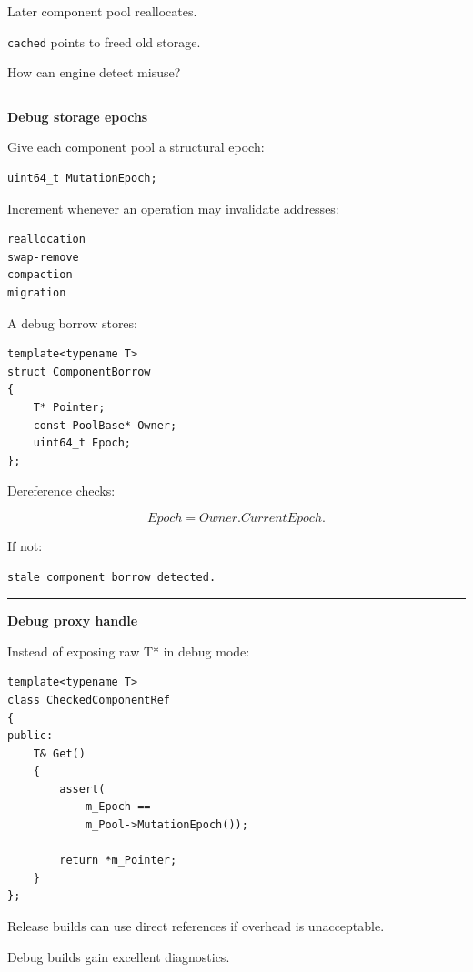 Later component pool reallocates.

\texttt{cached} points to freed old storage.

How can engine detect misuse?

\begin{center}\rule{0.5\linewidth}{0.5pt}\end{center}

\textbf{Debug storage epochs}

Give each component pool a structural epoch:

\begin{verbatim}
uint64_t MutationEpoch;
\end{verbatim}

Increment whenever an operation may invalidate addresses:

\begin{verbatim}
reallocation
swap-remove
compaction
migration
\end{verbatim}

A debug borrow stores:

\begin{verbatim}
template<typename T>
struct ComponentBorrow
{
    T* Pointer;
    const PoolBase* Owner;
    uint64_t Epoch;
};
\end{verbatim}

Dereference checks:

\[
Epoch=Owner.CurrentEpoch.
\]

If not:

\begin{verbatim}
stale component borrow detected.
\end{verbatim}

\begin{center}\rule{0.5\linewidth}{0.5pt}\end{center}

\textbf{Debug proxy handle}

Instead of exposing raw T* in debug mode:

\begin{verbatim}
template<typename T>
class CheckedComponentRef
{
public:
    T& Get()
    {
        assert(
            m_Epoch ==
            m_Pool->MutationEpoch());

        return *m_Pointer;
    }
};
\end{verbatim}

Release builds can use direct references if overhead is unacceptable.

Debug builds gain excellent diagnostics.

